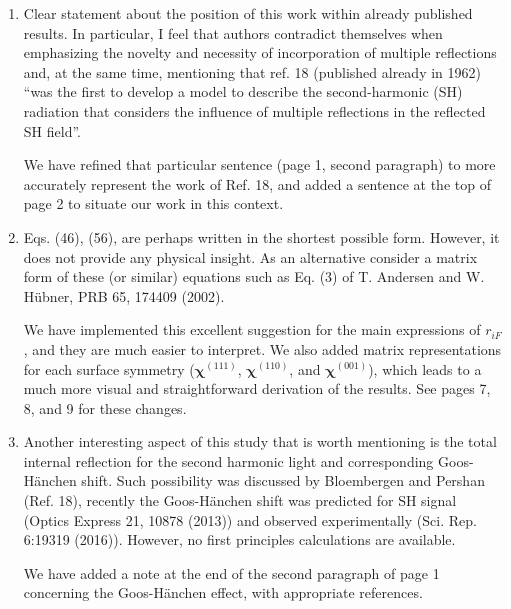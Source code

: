 \documentclass[11pt]{article}
\begin{document}
\begin{enumerate}

\item
Clear statement about the position of this work within already published
results. In particular, I feel that authors contradict themselves when
emphasizing the novelty and necessity of incorporation of multiple reflections
and, at the same time, mentioning that ref. 18 (published already in 1962) ``was
the first to develop a model to describe the second-harmonic (SH) radiation that
considers the influence of multiple reflections in the reflected SH field''.
\begin{shaded}
We have refined that particular sentence (page 1, second paragraph) to more
accurately represent the work of Ref. 18, and added a sentence at the top of
page 2 to situate our work in this context.
\end{shaded}

\item
Eqs. (46), (56), are perhaps written in the shortest possible form. However, it
does not provide any physical insight. As an alternative consider a matrix form
of these (or similar) equations such as Eq. (3) of T. Andersen and W. H\"ubner,
PRB 65, 174409 (2002).
\begin{shaded}
We have implemented this excellent suggestion for the main expressions of
$r_{iF}$, and they are much easier to interpret. We also added matrix
representations for each surface symmetry ($\boldsymbol{\chi}^{(111)}$,
$\boldsymbol{\chi}^{(110)}$, and $\boldsymbol{\chi}^{(001)}$), which leads to a
much more visual and straightforward derivation of the results. See pages 7, 8,
and 9 for these changes.
\end{shaded}

\item
Another interesting aspect of this study that is worth mentioning is the total
internal reflection for the second harmonic light and corresponding
Goos-H\"anchen shift. Such possibility was discussed by Bloembergen and Pershan
(Ref. 18), recently the Goos-H\"anchen shift was predicted for SH signal (Optics
Express 21, 10878 (2013)) and observed experimentally (Sci. Rep. 6:19319
(2016)). However, no first principles calculations are available.
\begin{shaded}
We have added a note at the end of the second paragraph of page 1 concerning the
Goos-H\"anchen effect, with appropriate references.
\end{shaded}


\end{enumerate}
\end{document}
